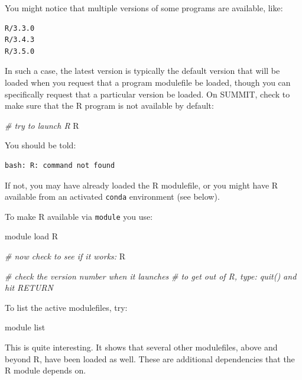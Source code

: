 \documentclass[]{krantz}
\makeatletter
\newenvironment{Shaded}{\begin{snugshade}}{\end{snugshade}}
\newcommand{\CommentTok}[1]{\textcolor[rgb]{0.37,0.37,0.37}{\textit{#1}}}
\newcommand{\ExtensionTok}[1]{#1}
\newcommand{\NormalTok}[1]{#1}
\newenvironment{kframe}{%
\medskip{}
\setlength{\fboxsep}{.8em}
 \def\at@end@of@kframe{}%
 \ifinner\ifhmode%
  \def\at@end@of@kframe{\end{minipage}}%
  \begin{minipage}{\columnwidth}%
 \fi\fi%
 \def\FrameCommand##1{\hskip\@totalleftmargin \hskip-\fboxsep
 \colorbox{shadecolor}{##1}\hskip-\fboxsep
     \hskip-\linewidth \hskip-\@totalleftmargin \hskip\columnwidth}%
 \MakeFramed {\advance\hsize-\width
   \@totalleftmargin\z@ \linewidth\hsize
   \@setminipage}}%
 {\par\unskip\endMakeFramed%
 \at@end@of@kframe}
\renewenvironment{Shaded}{\begin{kframe}}{\end{kframe}}
\makeatother
\begin{document}
You might notice that multiple versions of some programs are available, like:

\begin{verbatim}
R/3.3.0
R/3.4.3
R/3.5.0
\end{verbatim}

In such a case, the latest version is typically the default version that will be loaded
when you request that a program modulefile be loaded, though you can specifically
request that a particular version be loaded. On SUMMIT, check to make sure that the R program
is not available by default:

\begin{Shaded}
\begin{Highlighting}[]
\CommentTok{# try to launch R}
\ExtensionTok{R}
\end{Highlighting}
\end{Shaded}

You should be told:

\begin{verbatim}
bash: R: command not found
\end{verbatim}

If not, you may have already loaded the R modulefile, or you might have R available from
an activated \texttt{conda} environment (see below).

To make R available via \texttt{module} you use:

\begin{Shaded}
\begin{Highlighting}[]
\ExtensionTok{module}\NormalTok{ load R}

\CommentTok{# now check to see if it works:}
\ExtensionTok{R}

\CommentTok{# check the version number when it launches}
\CommentTok{# to get out of R, type: quit()  and hit RETURN}
\end{Highlighting}
\end{Shaded}

To list the active modulefiles, try:

\begin{Shaded}
\begin{Highlighting}[]
\ExtensionTok{module}\NormalTok{ list}
\end{Highlighting}
\end{Shaded}

This is quite interesting. It shows that several other modulefiles,
above and beyond R,
have been loaded as well. These are additional dependencies that the R module
depends on.
\end{document}
